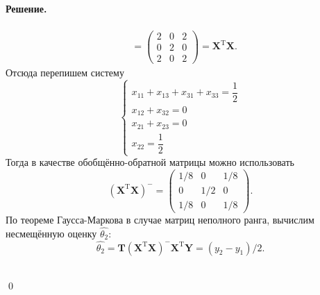 \documentclass[specialist, subf, href, 12pt]{article}
\newenvironment{solution}{\paragraph{Решение.}}{\hfill\\\hfill\qed}
\begin{document}
\begin{solution}
\begin{align*}
			&=\begin{pmatrix}
				2&0&2\\
				0&2&0\\
				2&0&2
			\end{pmatrix}=\bm{X}^\mathrm{T}\bm{X}.
		\end{align*}
		Отсюда перепишем систему
		\begin{equation*}
			\begin{cases}
				x_{11}+x_{13}+x_{31}+x_{33}=\dfrac{1}{2}\\
				x_{12}+x_{32}=0\\
				x_{21}+x_{23}=0\\
				x_{22}=\dfrac{1}{2}
			\end{cases}
		\end{equation*}
		Тогда в качестве обобщённо-обратной матрицы можно использовать
		\begin{equation*}
			(\bm{X}^\mathrm{T}\bm{X})^-=\begin{pmatrix}
				1/8&0&1/8\\
				0&1/2&0\\
				1/8&0&1/8
			\end{pmatrix}.
		\end{equation*}
		По теореме Гаусса-Маркова в случае матриц неполного ранга, вычислим несмещённую оценку $\widehat{\theta_2}$:
		\begin{equation*}
			\widehat{\theta_2}=\bm{T}(\bm{X}^\mathrm{T}\bm{X})^-\bm{X}^\mathrm{T}\bm{Y}=(y_2-y_1)/2.
		\end{equation*}

\end{solution}
\end{document}

